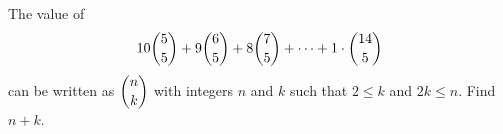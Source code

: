 The value of
\[10\dbinom55+9\dbinom65+8\dbinom75+\cdots+1\cdot\dbinom{14}{5}\]
can be written as $\dbinom nk$ with integers $n$ and $k$ such that $2\le k$ and $2k\le n$. Find $n+k$.
